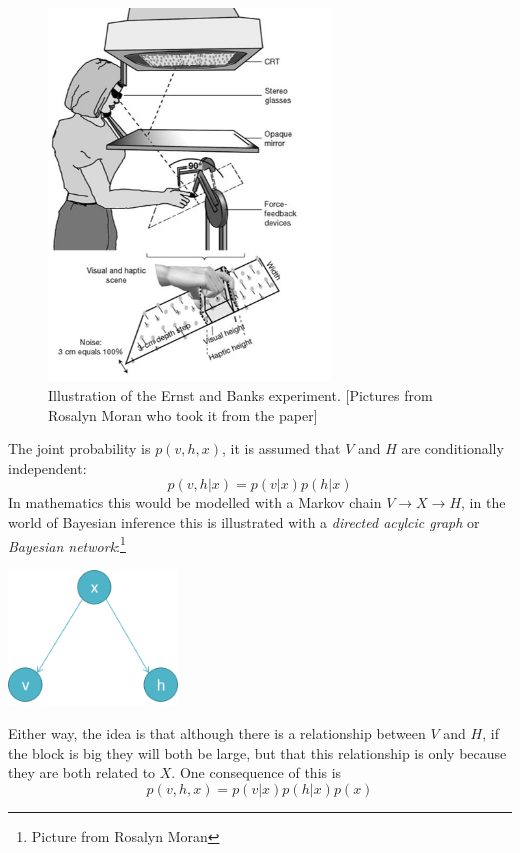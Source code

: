 \documentclass{article}
\begin{document}
\begin{figure}[htb]
\begin{center}
\includegraphics[width=7.5cm]{fig_ernstbanks.png}
\end{center}
\caption{Illustration of the Ernst and Banks experiment. [Pictures
    from Rosalyn Moran who took it from the
    paper]\label{fig_ernstbanks}}
\end{figure}

The joint probability is $p(v,h,x)$, it is assumed that $V$ and $H$
are conditionally independent: 
\begin{equation}
p(v,h|x)=p(v|x)p(h|x)
\end{equation}
In mathematics this would be modelled with a Markov chain
$V\rightarrow X\rightarrow H$, in the world of Bayesian inference this
is illustrated with a \textsl{directed acylcic graph} or \textsl{Bayesian network}:\footnote{Picture from Rosalyn Moran}
\begin{center}
\includegraphics[width=4.5cm]{fig_dag.png}
\end{center}
Either way, the idea is that although there is a relationship between
$V$ and $H$, if the block is big they will both be large, but that
this relationship is only because they are both related to $X$. One consequence of this is
\begin{equation}
p(v,h,x)=p(v|x)p(h|x)p(x)
\end{equation}
\end{document}
